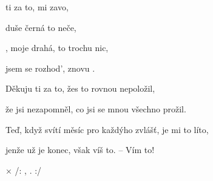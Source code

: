 

\zs
{} ti za to,  mi  zavo,  

 duše černá  to  neče,  

, moje drahá,  to  trochu  nic,  

 jsem se rozhod',   znovu .  
\ks

\zs
Děkuju ti za to, žes to rovnou nepoložil,

že jsi nezapomněl, co jsi se mnou všechno prožil.

Teď, když svítí měsíc pro každýho zvlášť, je mi to líto,

jenže už je konec, však víš to. -- Vím to!
\ks

× /: ,   .   :/

\kr

\kp
